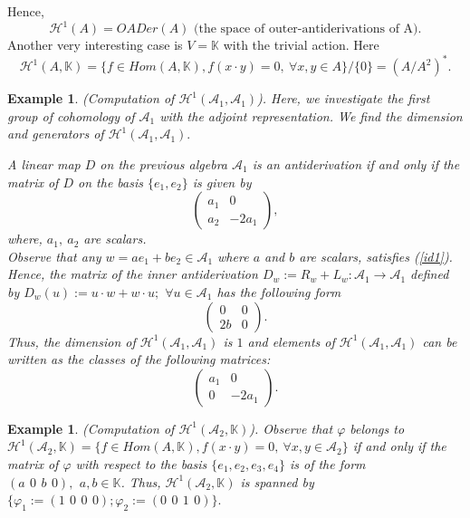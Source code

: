 \documentclass[12pt]{amsart}
\newtheorem{example}[Theorem]{Example}
\begin{document}
	Hence, $$\mathcal{H}^{1}(A)=OADer(A) \mbox{  (the space of outer-antiderivations of A).}$$
Another very interesting case is $V=\mathbb{K}$ with the trivial action. Here
$$\mathcal{H}^1(A,\mathbb{K})=\{f\in Hom(A,\mathbb{K}), f(x\cdot y)=0,\ \forall x,y\in A\}/\{0\}=(A/A^2)^*.$$
\begin{example}\label{ex1} (Computation of $\mathcal{H}^1(\mathcal{A}_1,\mathcal{A}_1)$). 
Here, we investigate the first group of cohomology
of $\mathcal{A}_1$ with the adjoint representation. We find the dimension and generators of $\mathcal{H}^1(\mathcal{A}_1,\mathcal{A}_1).$

A linear map $D$ on the previous algebra $\mathcal{A}_1$ is an antiderivation if and only if the matrix of $D$ on the basis $\{e_1, e_2\}$ is given by
$$\left(
\begin{array}{cc}
	a_1&0\\
	a_2&-2a_1
\end{array}
\right),$$ where, $a_1,\ a_2$ are scalars.\\

Observe that any $w=ae_1+be_2 \in \mathcal{A}_1$ where $a$ and $b$ are scalars, satisfies (\ref{id1}). Hence, the matrix of the inner antiderivation $D_w:= R_w+L_w:\mathcal{A}_1\rightarrow \mathcal{A}_1$ defined by $D_w (u):= u\cdot w+w\cdot u;$ $\forall u\in \mathcal{A}_1$ has the following form
$$\left(
\begin{array}{cc}
	0&0\\
	2b&0
\end{array}
\right).$$
 Thus, the dimension of $\mathcal{H}^1(\mathcal{A}_1,\mathcal{A}_1)$ is $1$ and elements of $\mathcal{H}^1(\mathcal{A}_1,\mathcal{A}_1)$
can be written as the classes of the following matrices:
$$\left(
\begin{array}{cc}
	a_1&0\\
	0&-2a_1
\end{array}
\right).$$
\end{example}
\begin{example}(Computation of $\mathcal{H}^1(\mathcal{A}_2,\mathbb{K})$). 
	Observe that $\varphi$ belongs to $\mathcal{H}^1(\mathcal{A}_2,\mathbb{K})=\{f\in Hom(A,\mathbb{K}), f(x\cdot y)=0,\ \forall x,y\in \mathcal{A}_2\}$ if and only if the matrix of $\varphi$ with respect to the basis $\{e_1, e_2, e_3, e_4 \}$ is of the form  $(a\,\ 0\,\ b\,\ 0),\,\ a,b\in \mathbb{K}$. Thus, $\mathcal{H}^1(\mathcal{A}_2,\mathbb{K})$ is spanned by $\{\varphi_1:=(1\,\ 0\,\ 0\,\ 0); \varphi_2:=(0\,\ 0\,\ 1\,\ 0)\}.$
\end{example}
\end{document}
